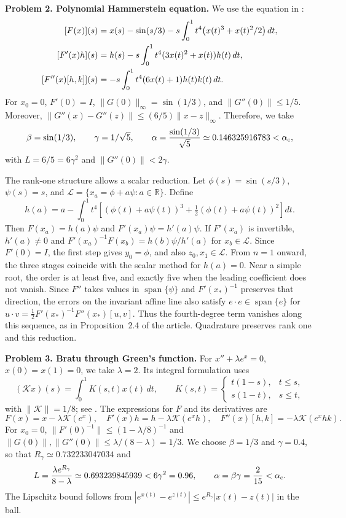 \documentclass[11pt,a4paper]{article}
\numberwithin{equation}{section}
\numberwithin{table}{section}
\theoremstyle{plain}
\theoremstyle{definition}\newtheorem{definition}[theorem]{Definition}
\theoremstyle{remark}\newtheorem{remark}[theorem]{Remark}
\begin{document}
\medskip
\noindent\textbf{Problem 2. Polynomial Hammerstein equation.}
We use the equation in \cite[Example~2, equation~(3.3), p.~4617]{CardenasCastroSierra2022}:
\[
\begin{aligned}
 \relax [F(x)](s)&=x(s)-\sin(s/3)
  -s\int_0^1t^4\bigl(x(t)^3+x(t)^2/2\bigr)\,dt,\\
 [F'(x)h](s)&=h(s)-s\int_0^1t^4(3x(t)^2+x(t))h(t)\,dt,\\
 [F''(x)[h,k]](s)&=-s\int_0^1t^4(6x(t)+1)h(t)k(t)\,dt.
\end{aligned}
\]
For $x_0=0$, $F'(0)=I$, $\|G(0)\|_\infty=\sin(1/3)$, and
$\|G''(0)\|\leq1/5$. Moreover,
$\|G''(x)-G''(z)\|\leq(6/5)\|x-z\|_\infty$. Therefore, we take
\[
 \beta=\sin(1/3),\qquad \gamma=1/\sqrt5,\qquad
 \alpha=\frac{\sin(1/3)}{\sqrt5}\simeq0.146325916783<\alpha_{\rm c},
\]
with $L=6/5=6\gamma^2$ and $\|G''(0)\|<2\gamma$.

The rank-one structure allows a scalar reduction. Let
$\phi(s)=\sin(s/3)$, $\psi(s)=s$, and
$\mathcal L=\{x_a=\phi+a\psi:a\in\mathbb R\}$. Define
\[
 h(a)=a-\int_0^1t^4\left[
 (\phi(t)+a\psi(t))^3+\tfrac12(\phi(t)+a\psi(t))^2\right]dt.
\]
Then $F(x_a)=h(a)\psi$ and $F'(x_a)\psi=h'(a)\psi$.
If $F'(x_a)$ is invertible, $h'(a)\neq0$ and
$F'(x_a)^{-1}F(x_b)=h(b)\psi/h'(a)$ for $x_b\in\mathcal L$.
Since $F'(0)=I$, the first step gives $y_0=\phi$, and also
$z_0,x_1\in\mathcal L$. From $n=1$ onward, the three stages coincide
with the scalar method for $h(a)=0$. Near a simple root, the order is
at least five, and exactly five when the leading coefficient does not
vanish. Since $F''$ takes values in $\operatorname{span}\{\psi\}$ and
$F'(x_*)^{-1}$ preserves that direction, the errors on the invariant
affine line also satisfy $e\cdot e\in\operatorname{span}\{e\}$ for
$u\cdot v=\tfrac12 F'(x_*)^{-1}F''(x_*)[u,v]$.
Thus the fourth-degree term vanishes along this sequence, as in
Proposition~2.4 of the article. Quadrature preserves rank one and
this reduction.

\medskip
\noindent\textbf{Problem 3. Bratu through Green's function.}
For $x''+\lambda e^x=0$, $x(0)=x(1)=0$, we take $\lambda=2$.
Its integral formulation uses
\[
 (\mathcal Kx)(s)=\int_0^1K(s,t)x(t)\,dt,\qquad
 K(s,t)=\begin{cases}t(1-s),&t\leq s,\\s(1-t),&s\leq t,\end{cases}
\]
with $\|\mathcal K\|=1/8$; see \cite{AhmadArshadUllahMa2023}.
The expressions for $F$ and its derivatives are
\[
 F(x)=x-\lambda\mathcal K(e^x),\quad
 F'(x)h=h-\lambda\mathcal K(e^xh),\quad
 F''(x)[h,k]=-\lambda\mathcal K(e^xhk).
\]
For $x_0=0$, $\|F'(0)^{-1}\|\leq(1-\lambda/8)^{-1}$ and
$\|G(0)\|,\|G''(0)\|\leq\lambda/(8-\lambda)=1/3$.
We choose $\beta=1/3$ and $\gamma=0.4$, so that
$R_\gamma\simeq0.732233047034$ and
\[
 L=\frac{\lambda e^{R_\gamma}}{8-\lambda}
 \simeq0.693239845939<6\gamma^2=0.96,\qquad
 \alpha=\beta\gamma=\frac2{15}<\alpha_{\rm c}.
\]
The Lipschitz bound follows from
$|e^{x(t)}-e^{z(t)}|\leq e^{R_\gamma}|x(t)-z(t)|$ in the ball.
\end{document}
